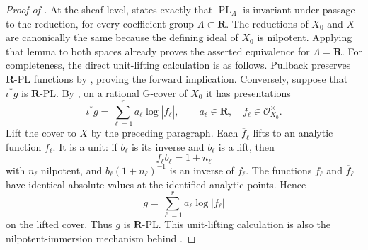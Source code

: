 \begin{proof}[Proof of ]
At the sheaf level, \cite[Lemma~5.4(3)]{GJR26} states exactly that
\(\operatorname{PL}_{\Lambda}\) is invariant under passage to the
reduction, for every coefficient group \(\Lambda\subset\mathbf R\).  The
reductions of \(X_0\) and \(X\) are canonically the same because the
defining ideal of \(X_0\) is nilpotent.  Applying that lemma to both spaces
already proves the asserted equivalence for \(\Lambda=\mathbf R\).  For
completeness, the direct unit-lifting calculation is as follows.  Pullback
preserves \(\mathbf R\)-PL functions by
\cite[Lemma~5.4(1)]{GJR26}, proving the forward implication.  Conversely,
suppose that \(\iota^*g\) is \(\mathbf R\)-PL.  By
\cite[Definition~5.1 and \S5.2(4)]{GJR26}, on a rational G-cover of
\(X_0\) it has presentations
\[
                  \iota^*g=\sum_{\ell=1}^r
                         a_\ell\log|\overline f_\ell|,
 \qquad a_\ell\in\mathbf R,\quad
        \overline f_\ell\in\mathcal O_{X_0}^{\times}.
\]
Lift the cover to \(X\) by the preceding paragraph.  Each
\(\overline f_\ell\) lifts to an analytic function \(f_\ell\).  It is a
unit: if \(\overline b_\ell\) is its inverse and \(b_\ell\) is a lift, then
\[
                         f_\ell b_\ell=1+n_\ell
\]
with \(n_\ell\) nilpotent, and
\(b_\ell(1+n_\ell)^{-1}\) is an inverse of \(f_\ell\).  The functions
\(f_\ell\) and \(\overline f_\ell\) have identical absolute values at the
identified analytic points.  Hence
\[
                         g=\sum_{\ell=1}^r
                              a_\ell\log|f_\ell|
\]
on the lifted cover.  Thus \(g\) is \(\mathbf R\)-PL.  This unit-lifting
calculation is also the nilpotent-immersion mechanism behind
\cite[Proposition~15.1.3(b)]{CLD25}.
\end{proof}

